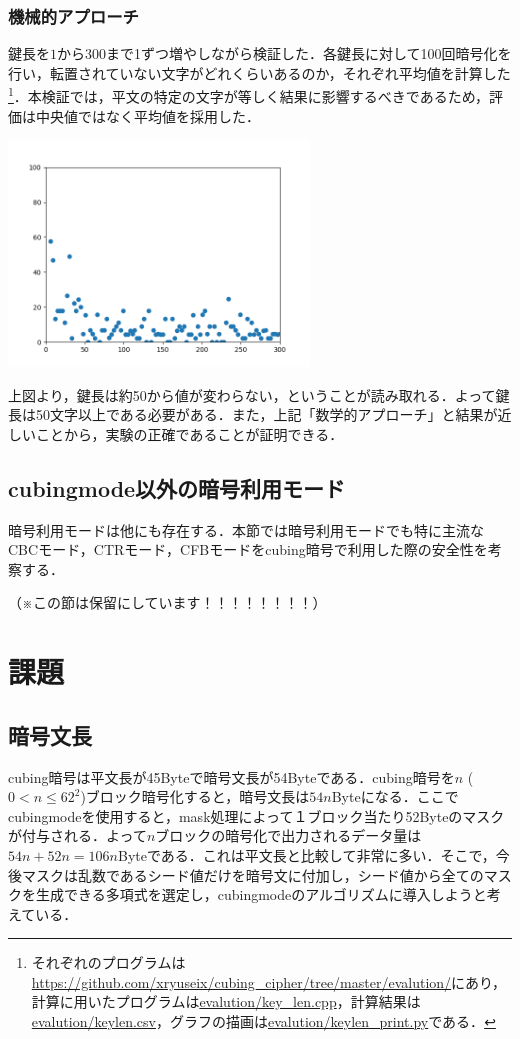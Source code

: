 \documentclass[titlepage]{jarticle}
\begin{document}
\subsubsection{機械的アプローチ}

鍵長を\(1\)から\(300\)まで1ずつ増やしながら検証した．各鍵長に対して100回暗号化を行い，転置されていない文字がどれくらいあるのか，それぞれ平均値を計算した\footnote{それぞれのプログラムは\url{https://github.com/xryuseix/cubing_cipher/tree/master/evalution/}にあり，計算に用いたプログラムは\url{evalution/key\_len.cpp}，計算結果は\url{evalution/keylen.csv}，グラフの描画は\url{evalution/keylen\_print.py}である．}．本検証では，平文の特定の文字が等しく結果に影響するべきであるため，評価は中央値ではなく平均値を採用した．\\
\begin{center}
  \includegraphics[width=8cm]{./tex_pic/figure.png}\\
\end{center}
上図より，鍵長は約50から値が変わらない，ということが読み取れる．よって鍵長は50文字以上である必要がある．また，上記「数学的アプローチ」と結果が近しいことから，実験の正確であることが証明できる．

\subsection{cubingmode以外の暗号利用モード}
暗号利用モードは他にも存在する．本節では暗号利用モードでも特に主流なCBCモード，CTRモード，CFBモードをcubing暗号で利用した際の安全性を考察する．

（※この節は保留にしています！！！！！！！！）

\section{課題}
\subsection{暗号文長}
cubing暗号は平文長が45Byteで暗号文長が54Byteである．cubing暗号を\(n\) (\(0 < n \leq 62^2\))ブロック暗号化すると，暗号文長は\(54n\)Byteになる．ここでcubingmodeを使用すると，mask処理によって１ブロック当たり52Byteのマスクが付与される．よって\(n\)ブロックの暗号化で出力されるデータ量は\(54n+52n=106n\)Byteである．これは平文長と比較して非常に多い．そこで，今後マスクは乱数であるシード値だけを暗号文に付加し，シード値から全てのマスクを生成できる多項式を選定し，cubingmodeのアルゴリズムに導入しようと考えている．
\end{document}
